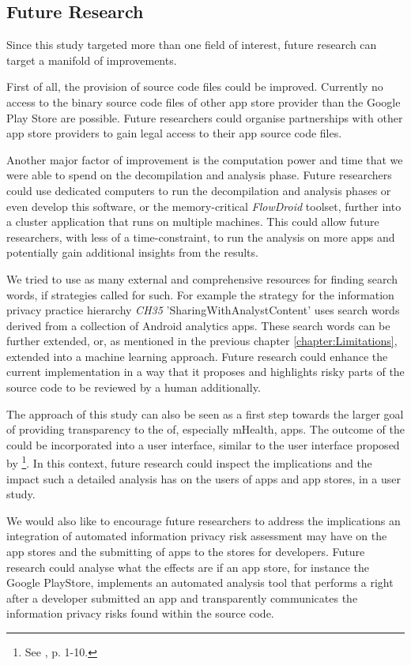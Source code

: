 \subsection{Future Research}

Since this study targeted more than one field of interest, future research can target a manifold of improvements.

First of all, the provision of source code files could be improved. 
Currently no access to the binary source code files of other app store provider than the Google Play Store are possible.
Future researchers could organise partnerships with other app store providers to gain legal access to their app source code files.

Another major factor of improvement is the computation power and time that we were able to spend on the decompilation and analysis phase.
Future researchers could use dedicated computers to run the decompilation and analysis phases or even develop this software, or the memory-critical \textit{FlowDroid} toolset, further into a cluster application that runs on multiple machines.
This could allow future researchers, with less of a time-constraint, to run the analysis on more apps and potentially gain additional insights from the results.

We tried to use as many external and comprehensive resources for finding search words, if strategies called for such.
For example the strategy for the information privacy practice hierarchy \textit{CH35} 'SharingWithAnalystContent' uses search words derived from a collection of Android analytics apps.
These search words can be further extended, or, as mentioned in the previous chapter \ref{chapter:Limitations}, extended into a machine learning approach. 
Future research could enhance the current implementation in a way that it proposes and highlights risky parts of the source code to be reviewed by a human additionally.

The approach of this study can also be seen as a first step towards the larger goal of providing transparency to the \ipr of, especially mHealth, apps.
The outcome of the \aiprat could be incorporated into a user interface, similar to the user interface proposed by \textcite{Bruggemann2016}\footnote{See \cite{Bruggemann2016}, p. 1-10.}.
In this context, future research could inspect the implications and the impact such a detailed \ipr analysis has on the users of apps and app stores, in a user study.

We would also like to encourage future researchers to address the implications an integration of automated information privacy risk assessment may have on the app stores and the submitting of apps to the stores for developers.
Future research could analyse what the effects are if an app store, for instance the Google PlayStore, implements an automated \ipr analysis tool that performs a \sca right after a developer submitted an app and transparently communicates the information privacy risks found within the source code.


